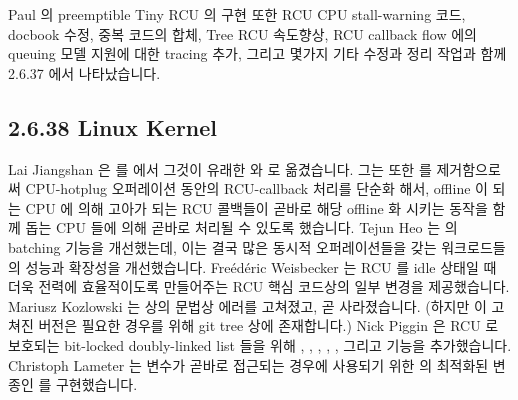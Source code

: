 Paul 의 preemptible Tiny RCU 의 구현 또한 RCU CPU stall-warning 코드, docbook
수정, 중복 코드의 합체, Tree RCU 속도향상, RCU callback flow 에의 queuing 모델
지원에 대한 tracing 추가, 그리고 몇가지 기타 수정과 정리 작업과 함께 2.6.37
에서 나타났습니다.

\subsection{2.6.38 Linux Kernel}

Lai Jiangshan 은  를  에서
그것이 유래한  와  로 옮겼습니다.
그는 또한  를 제거함으로써 CPU-hotplug 오퍼레이션 동안의
RCU-callback 처리를 단순화 해서, offline 이 되는 CPU 에 의해 고아가 되는 RCU
콜백들이 곧바로 해당 offline 화 시키는 동작을 함께 돕는 CPU 들에 의해 곧바로
처리될 수 있도록 했습니다.
Tejun Heo 는  의 batching 기능을 개선했는데,
이는 결국 많은 동시적  오퍼레이션들을 갖는
워크로드들의 성능과 확장성을 개선했습니다.
Fre\'ed\'eric Weisbecker 는 RCU 를 idle 상태일 때 더욱 전력에 효율적이도록
만들어주는 RCU 핵심 코드상의 일부 변경을 제공했습니다.
Mariusz Kozlowski 는  상의 문법상 에러를 고쳐졌고, 곧
사라졌습니다.
(하지만 이 고쳐진 버전은 필요한 경우를 위해 git tree 상에 존재합니다.)
Nick Piggin 은 RCU 로 보호되는 bit-locked doubly-linked list 들을 위해
,
,
,
,
, 그리고
 기능을 추가했습니다.
Christoph Lameter 는 변수가 곧바로 접근되는 경우에 사용되기 위한
 의 최적화된 변종인  를 구현했습니다.
\iffalse

